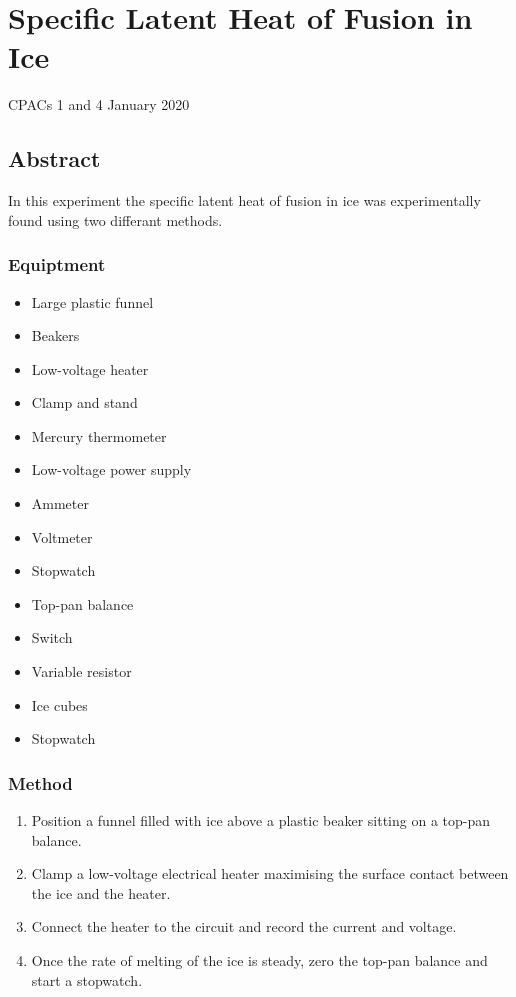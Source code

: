 \section{Specific Latent Heat of Fusion in Ice}
CPACs 1 and 4
\hfill
{} January 2020

\subsection{Abstract}
In this experiment the specific latent heat of fusion in ice was experimentally found using two differant methods.

\subsubsection{Equiptment}
\begin{itemize}
\item Large plastic funnel
\item Beakers
\item Low-voltage heater
\item Clamp and stand
\item Mercury thermometer
\item Low-voltage power supply
\item Ammeter
\item Voltmeter
\item Stopwatch
\item Top-pan balance
\item Switch
\item Variable resistor
\item Ice cubes
\item Stopwatch
\end{itemize}

\subsubsection{Method}
\begin{enumerate}
\item Position a funnel filled with ice above a plastic beaker sitting on a top-pan balance.
\item Clamp a low-voltage electrical heater maximising the surface contact between the ice and the heater.
\item Connect the heater to the circuit and record the current and voltage.
\item Once the rate of melting of the ice is steady, zero the top-pan balance and start a stopwatch.
\end{enumerate}


